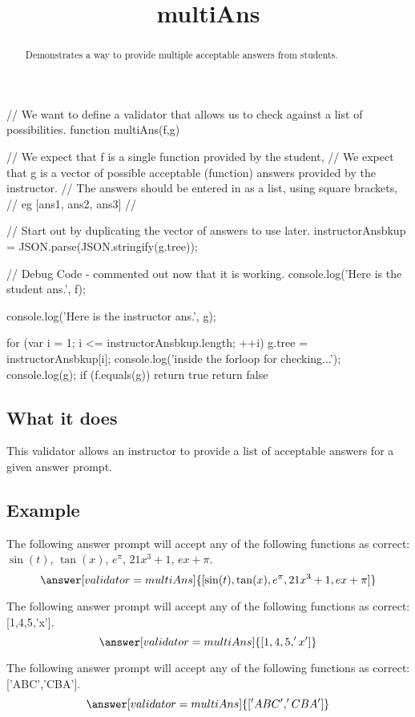 \documentclass{ximera}
\title{multiAns}
\begin{document}
\begin{abstract}
    Demonstrates a way to provide multiple acceptable answers from students.
\end{abstract}
\maketitle

\begin{javascript}
// We want to define a validator that allows us to check against a list of possibilities.
function multiAns(f,g) {
    // We expect that f is a single function provided by the student,
    // We expect that g is a vector of possible acceptable (function) answers provided by the instructor.
    //      The answers should be entered in as a list, using square brackets,
    //      eg [ans1, ans2, ans3]
    //
    
    // Start out by duplicating the vector of answers to use later.
    instructorAnsbkup = JSON.parse(JSON.stringify(g.tree));
    
     //   Debug Code - commented out now that it is working.
    console.log('Here is the student ans.', f);
    
    console.log('Here is the instructor ans.', g);
    
    
    for (var i = 1; i <= instructorAnsbkup.length; ++i) {
        g.tree = instructorAnsbkup[i];
        console.log('inside the forloop for checking...');
        console.log(g);
        if (f.equals(g)){
            return true
        }
    }
return false
}
  
\end{javascript}

\subsection*{What it does}
    This validator allows an instructor to provide a list of acceptable answers for a given answer prompt.


\subsection*{Example}
    \begin{problem}
        The following answer prompt will accept any of the following functions as correct: $\sin(t)$, $\tan(x)$, $e^\pi$, $21x^3 + 1$, $ex + \pi$.
        \[
            \answer[validator=multiAns]{[\sin(t),\tan(x),e^\pi,21x^3 + 1,ex + \pi]}
        \]
    \end{problem}

    \begin{problem}
        The following answer prompt will accept any of the following functions as correct: [1,4,5,'x']. 
        \[
            \answer[validator=multiAns]{[1,4,5,'x']}
        \]
    \end{problem}

    \begin{problem}
        The following answer prompt will accept any of the following functions as correct: ['ABC','CBA']. 
        \[
            \answer[validator=multiAns]{['ABC','CBA']}
        \]
    \end{problem}
\end{document}
